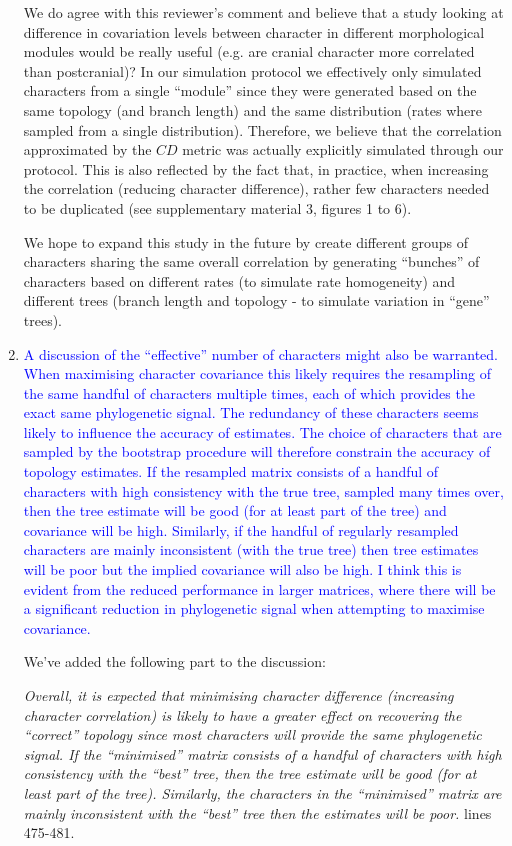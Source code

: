 \documentclass[12pt,letterpaper]{article}
\begin{document}
\begin{enumerate}
We do agree with this reviewer's comment and believe that a study looking at difference in covariation levels between character in different morphological modules would be really useful (e.g. are cranial character more correlated than postcranial)?
In our simulation protocol we effectively only simulated characters from a single ``module'' since they were generated based on the same topology (and branch length) and the same distribution (rates where sampled from a single distribution).
Therefore, we believe that the correlation approximated by the $CD$ metric was actually explicitly simulated through our protocol.
This is also reflected by the fact that, in practice, when increasing the correlation (reducing character difference), rather few characters needed to be duplicated (see supplementary material 3, figures 1 to 6).

We hope to expand this study in the future by create different groups of characters sharing the same overall correlation by generating ``bunches'' of characters based on different rates (to simulate rate homogeneity) and different trees (branch length and topology - to simulate variation in ``gene'' trees).

\item{\textcolor{blue}{A discussion of the ``effective'' number of characters might also be warranted. When maximising character covariance this likely requires the resampling of the same handful of characters multiple times, each of which provides the exact same phylogenetic signal. The redundancy of these characters seems likely to influence the accuracy of estimates. The choice of characters that are sampled by the bootstrap procedure will therefore constrain the accuracy of topology estimates. If the resampled matrix consists of a handful of characters with high consistency with the true tree, sampled many times over, then the tree estimate will be good (for at least part of the tree) and covariance will be high. Similarly, if the handful of regularly resampled characters are mainly inconsistent (with the true tree) then tree estimates will be poor but the implied covariance will also be high. I think this is evident from the reduced performance in larger matrices, where there will be a significant reduction in phylogenetic signal when attempting to maximise covariance.}}

We've added the following part to the discussion:

\textit{Overall, it is expected that minimising character difference (increasing character correlation) is likely to have a greater effect on recovering the ``correct'' topology since most characters will provide the same phylogenetic signal.
If the ``minimised'' matrix consists of a handful of characters with high consistency with the ``best'' tree, then the tree estimate will be good (for at least part of the tree).
Similarly, the characters in the ``minimised'' matrix are mainly inconsistent with the ``best'' tree then the estimates will be poor.} lines 475-481.


\end{enumerate}
\end{document}
